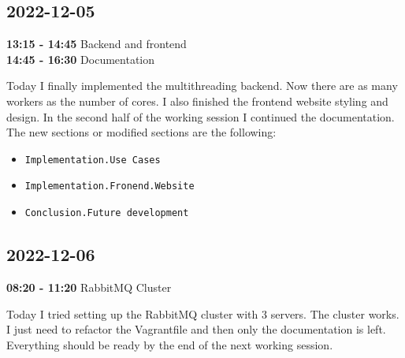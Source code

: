 \documentclass{article}
\begin{document}
\subsection{2022-12-05}

\textbf{13:15 - 14:45} Backend and frontend \\
\textbf{14:45 - 16:30} Documentation

Today I finally implemented the multithreading backend.
Now there are as many workers as the number of cores.
I also finished the frontend website styling and design.
In the second half of the working session I continued the documentation.
The new sections or modified sections are the following:
\begin{itemize}
    \item \texttt{Implementation.Use Cases}
    \item \texttt{Implementation.Fronend.Website}
    \item \texttt{Conclusion.Future development}
\end{itemize}

\subsection{2022-12-06}

\textbf{08:20 - 11:20} RabbitMQ Cluster

Today I tried setting up the RabbitMQ cluster with 3 servers.
The cluster works. I just need to refactor the Vagrantfile
and then only the documentation is left.
Everything should be ready by the end of the next working session.
\end{document}
